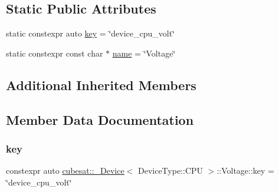 \subsection*{Static Public Attributes}
\begin{DoxyCompactItemize}
\item 
static constexpr auto \hyperlink{structcubesat_1_1__Device_3_01DeviceType_1_1CPU_01_4_1_1Voltage_a943a827f73ca25c3ce011cf75ac3e299}{key} = \char`\"{}device\+\_\+cpu\+\_\+volt\char`\"{}
\item 
static constexpr const char $\ast$ \hyperlink{structcubesat_1_1__Device_3_01DeviceType_1_1CPU_01_4_1_1Voltage_a8a980a78ea3a5d028da6acea89c26950}{name} = \char`\"{}Voltage\char`\"{}
\end{DoxyCompactItemize}
\subsection*{Additional Inherited Members}


\subsection{Member Data Documentation}
\mbox{\label{structcubesat_1_1__Device_3_01DeviceType_1_1CPU_01_4_1_1Voltage_a943a827f73ca25c3ce011cf75ac3e299}} 
\subsubsection{\texorpdfstring{key}{key}}
{\footnotesize\ttfamily constexpr auto \hyperlink{structcubesat_1_1__Device}{cubesat\+::\+\_\+\+Device}$<$ Device\+Type\+::\+C\+PU $>$\+::Voltage\+::key = \char`\"{}device\+\_\+cpu\+\_\+volt\char`\"{}\hspace{0.3cm}{\ttfamily [static]}}

\mbox{\label{structcubesat_1_1__Device_3_01DeviceType_1_1CPU_01_4_1_1Voltage_a8a980a78ea3a5d028da6acea89c26950}} 
